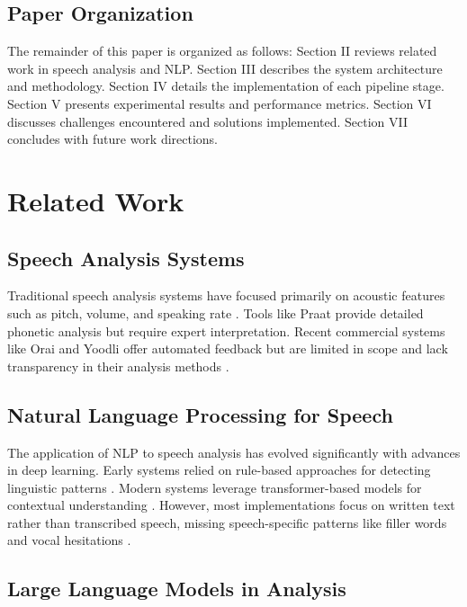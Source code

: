 \documentclass[conference]{IEEEtran}
\begin{document}
\subsection{Paper Organization}

The remainder of this paper is organized as follows: Section II reviews related work in speech analysis and NLP. Section III describes the system architecture and methodology. Section IV details the implementation of each pipeline stage. Section V presents experimental results and performance metrics. Section VI discusses challenges encountered and solutions implemented. Section VII concludes with future work directions.

\section{Related Work}

\subsection{Speech Analysis Systems}

Traditional speech analysis systems have focused primarily on acoustic features such as pitch, volume, and speaking rate \cite{boersma2021praat}. Tools like Praat \cite{boersma2001praat} provide detailed phonetic analysis but require expert interpretation. Recent commercial systems like Orai and Yoodli offer automated feedback but are limited in scope and lack transparency in their analysis methods \cite{schneider2015presentation}.

\subsection{Natural Language Processing for Speech}

The application of NLP to speech analysis has evolved significantly with advances in deep learning. Early systems relied on rule-based approaches for detecting linguistic patterns \cite{manning1999foundations}. Modern systems leverage transformer-based models for contextual understanding \cite{vaswani2017attention}. However, most implementations focus on written text rather than transcribed speech, missing speech-specific patterns like filler words and vocal hesitations \cite{biber2009register}.

\subsection{Large Language Models in Analysis}
\end{document}
